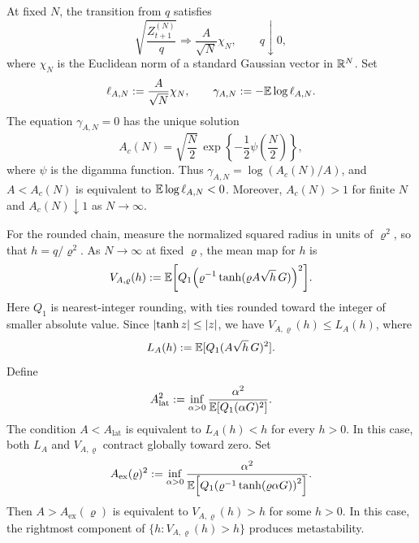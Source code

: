 \documentclass[11pt,reqno,a4paper]{article}
\newcommand{\Ee}{\E}
\begin{document}
At fixed $N$, the transition from $q$ satisfies
\begin{equation*}
  \sqrt{\frac{Z_{t+1}^{(N)}}q}
  \Longrightarrow
  \frac A{\sqrt N}\chi_N,
  \qquad
  q\downarrow0,
\end{equation*}
where $\chi_N$ is the Euclidean norm of a standard Gaussian vector in
$\mathbb{R}^N$. Set
\begin{equation*}
  \ell_{A,N}:=\frac A{\sqrt N}\chi_N,
  \qquad
  \gamma_{A,N}:=-\Ee\log\ell_{A,N}.
\end{equation*}
The equation $\gamma_{A,N}=0$ has the unique solution
\begin{equation}\label{eq:intro-fixed-width-threshold}
  A_c(N)
  =
  \sqrt{\frac N2}\,
  \exp\left\{-\frac12\psi\left(\frac N2\right)\right\},
\end{equation}
where $\psi$ is the digamma function. Thus
$\gamma_{A,N}=\log(A_c(N)/A)$, and $A<A_c(N)$ is equivalent to
$\Ee\log\ell_{A,N}<0$. Moreover, $A_c(N)>1$ for finite $N$ and
$A_c(N)\downarrow1$ as $N\to\infty$.

For the rounded chain, measure the normalized squared radius in units of
$\varrho^2$, so that $h=q/\varrho^2$. As $N\to\infty$ at fixed $\varrho$,
the mean map for $h$ is
\begin{equation}\label{eq:intro-rounded-map}
  V_{A,\varrho}(h)
  :=
  \Ee\left[
    Q_1\left(
      \varrho^{-1}\tanh(\varrho A\sqrt h\,G)
    \right)^2
  \right].
\end{equation}
Here $Q_1$ is nearest-integer rounding, with ties rounded toward the integer
of smaller absolute value. Since $\abs{\tanh z}\leq\abs z$, we have
$V_{A,\varrho}(h)\leq L_A(h)$, where
\begin{equation*}
  L_A(h):=\Ee[Q_1(A\sqrt h\,G)^2].
\end{equation*}
Define
\begin{equation}\label{eq:intro-lattice-threshold}
  A_{\mathrm{lat}}^2
  :=
  \inf_{\alpha>0}
  \frac{\alpha^2}{\Ee[Q_1(\alpha G)^2]} .
\end{equation}
The condition $A<A_{\mathrm{lat}}$ is equivalent to
$L_A(h)<h$ for every $h>0$. In this case, both $L_A$ and
$V_{A,\varrho}$ contract globally toward zero. Set
\begin{equation}\label{eq:intro-metastable-threshold}
  A_{\mathrm{ex}}(\varrho)^2
  :=
  \inf_{\alpha>0}
  \frac{\alpha^2}
  {\Ee\left[
    Q_1\left(\varrho^{-1}\tanh(\varrho\alpha G)\right)^2
  \right]} .
\end{equation}
Then $A>A_{\mathrm{ex}}(\varrho)$ is equivalent to
$V_{A,\varrho}(h)>h$ for some $h>0$. In this case, the rightmost component of
$\{h:V_{A,\varrho}(h)>h\}$ produces metastability.
\end{document}
